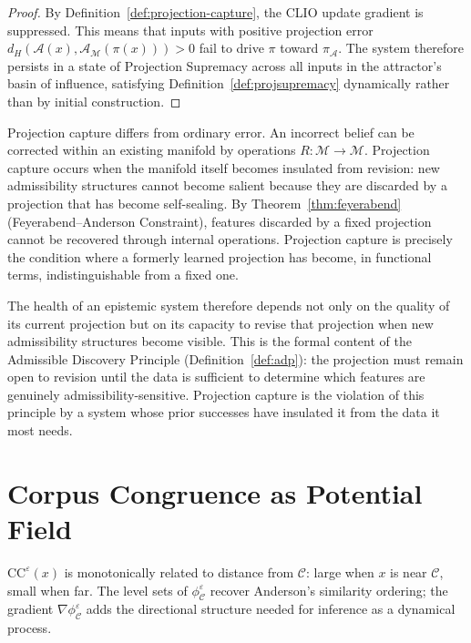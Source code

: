 \documentclass[12pt, a4paper, oneside]{book}
\newcommand{\Adm}{\mathcal{A}}
\newcommand{\M}{\mathcal{M}}
\newcommand{\C}{\mathcal{C}}
\newcommand{\proj}{\pi}
\newcommand{\projA}{\pi_{\!\Adm}}
\newcommand{\dH}{d_H}
\newcommand{\CC}{\mathrm{CC}}
\newcommand{\phiCe}{\phi_{\C}^{\varepsilon}}
\begin{document}
\begin{proof}
By Definition~\ref{def:projection-capture}, the CLIO update gradient is
suppressed. This means that inputs with positive projection error
$\dH(\Adm(x), \Adm_\M(\proj(x))) > 0$ fail to drive $\proj$ toward
$\projA$. The system therefore persists in a state of Projection
Supremacy across all inputs in the attractor's basin of influence,
satisfying Definition~\ref{def:projsupremacy} dynamically rather than
by initial construction.
\end{proof}

\begin{remark}
Projection capture differs from ordinary error. An incorrect belief can
be corrected within an existing manifold by operations $R : \M \to \M$.
Projection capture occurs when the manifold itself becomes insulated
from revision: new admissibility structures cannot become salient
because they are discarded by a projection that has become self-sealing.
By Theorem~\ref{thm:feyerabend} (Feyerabend--Anderson Constraint),
features discarded by a fixed projection cannot be recovered through
internal operations. Projection capture is precisely the condition where
a formerly learned projection has become, in functional terms,
indistinguishable from a fixed one.

The health of an epistemic system therefore depends not only on the
quality of its current projection but on its capacity to revise that
projection when new admissibility structures become visible. This is the
formal content of the Admissible Discovery Principle
(Definition~\ref{def:adp}): the projection must remain open to revision
until the data is sufficient to determine which features are genuinely
admissibility-sensitive. Projection capture is the violation of this
principle by a system whose prior successes have insulated it from the
data it most needs.
\end{remark}

\chapter{Corpus Congruence as Potential Field}
\label{ch:potential}

\begin{proposition}
$\CC^\varepsilon(x)$ is monotonically related to distance from $\C$:
large when $x$ is near $\C$, small when far. The level sets of $\phiCe$
recover Anderson's similarity ordering; the gradient $\nabla\phiCe$
adds the directional structure needed for inference as a dynamical process.
\end{proposition}
\end{document}
